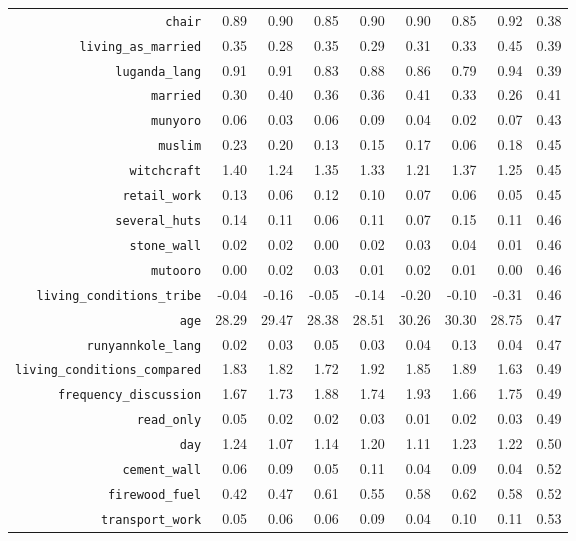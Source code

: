 \begin{longtable}{rrrrrrrrr}
  {\texttt{chair}} & 0.89 & 0.90 & 0.85 & 0.90 & 0.90 & 0.85 & 0.92 & 0.38 \\ 
  {\texttt{living\_as\_married}} & 0.35 & 0.28 & 0.35 & 0.29 & 0.31 & 0.33 & 0.45 & 0.39 \\ 
  {\texttt{luganda\_lang}} & 0.91 & 0.91 & 0.83 & 0.88 & 0.86 & 0.79 & 0.94 & 0.39 \\ 
  {\texttt{married}} & 0.30 & 0.40 & 0.36 & 0.36 & 0.41 & 0.33 & 0.26 & 0.41 \\ 
  {\texttt{munyoro}} & 0.06 & 0.03 & 0.06 & 0.09 & 0.04 & 0.02 & 0.07 & 0.43 \\ 
  {\texttt{muslim}} & 0.23 & 0.20 & 0.13 & 0.15 & 0.17 & 0.06 & 0.18 & 0.45 \\ 
  {\texttt{witchcraft}} & 1.40 & 1.24 & 1.35 & 1.33 & 1.21 & 1.37 & 1.25 & 0.45 \\ 
  {\texttt{retail\_work}} & 0.13 & 0.06 & 0.12 & 0.10 & 0.07 & 0.06 & 0.05 & 0.45 \\ 
  {\texttt{several\_huts}} & 0.14 & 0.11 & 0.06 & 0.11 & 0.07 & 0.15 & 0.11 & 0.46 \\ 
  {\texttt{stone\_wall}} & 0.02 & 0.02 & 0.00 & 0.02 & 0.03 & 0.04 & 0.01 & 0.46 \\ 
  {\texttt{mutooro}} & 0.00 & 0.02 & 0.03 & 0.01 & 0.02 & 0.01 & 0.00 & 0.46 \\ 
  {\texttt{living\_conditions\_tribe}} & -0.04 & -0.16 & -0.05 & -0.14 & -0.20 & -0.10 & -0.31 & 0.46 \\ 
  {\texttt{age}} & 28.29 & 29.47 & 28.38 & 28.51 & 30.26 & 30.30 & 28.75 & 0.47 \\ 
  {\texttt{runyannkole\_lang}} & 0.02 & 0.03 & 0.05 & 0.03 & 0.04 & 0.13 & 0.04 & 0.47 \\ 
  {\texttt{living\_conditions\_compared}} & 1.83 & 1.82 & 1.72 & 1.92 & 1.85 & 1.89 & 1.63 & 0.49 \\ 
  {\texttt{frequency\_discussion}} & 1.67 & 1.73 & 1.88 & 1.74 & 1.93 & 1.66 & 1.75 & 0.49 \\ 
  {\texttt{read\_only}} & 0.05 & 0.02 & 0.02 & 0.03 & 0.01 & 0.02 & 0.03 & 0.49 \\ 
  {\texttt{day}} & 1.24 & 1.07 & 1.14 & 1.20 & 1.11 & 1.23 & 1.22 & 0.50 \\ 
  {\texttt{cement\_wall}} & 0.06 & 0.09 & 0.05 & 0.11 & 0.04 & 0.09 & 0.04 & 0.52 \\ 
  {\texttt{firewood\_fuel}} & 0.42 & 0.47 & 0.61 & 0.55 & 0.58 & 0.62 & 0.58 & 0.52 \\ 
  {\texttt{transport\_work}} & 0.05 & 0.06 & 0.06 & 0.09 & 0.04 & 0.10 & 0.11 & 0.53 \\ 

\end{longtable}
